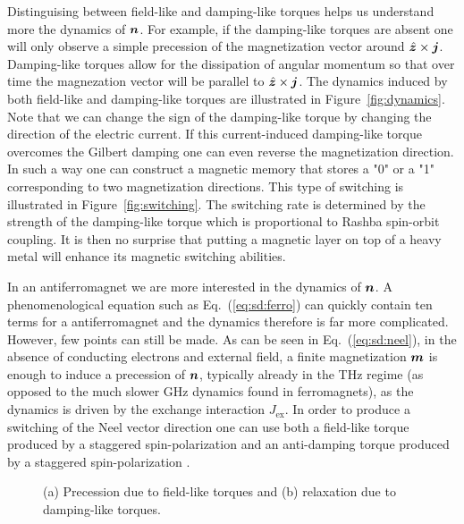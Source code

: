 Distinguising between field-like and damping-like torques helps us understand more the dynamics of $\boldsymbol{n}$. For example, if the damping-like torques are absent one will only observe a simple precession of the magnetization vector around $\hat{\boldsymbol{z}}\times\boldsymbol{j}$. Damping-like torques allow for the dissipation of angular momentum so that over time the magnezation vector will be parallel to $\hat{\boldsymbol{z}}\times\boldsymbol{j}$. The dynamics induced by both field-like and damping-like torques are illustrated in Figure~\ref{fig:dynamics}. Note that we can change the sign of the damping-like torque by changing the direction of the electric current. If this current-induced damping-like torque overcomes the Gilbert damping one can even reverse the magnetization direction. In such a way one can construct a magnetic memory that stores a "0" or a "1" corresponding to two magnetization directions. This type of switching is illustrated in Figure~\ref{fig:switching}. The switching rate is determined by the strength of the damping-like torque which is proportional to Rashba spin-orbit coupling. It is then no surprise that putting a magnetic layer on top of a heavy metal will enhance its magnetic switching abilities. 

In an antiferromagnet we are more interested in the dynamics of $\boldsymbol{n}$. A phenomenological equation such as Eq.~(\ref{eq:sd:ferro}) can quickly contain ten terms for a antiferromagnet and the dynamics therefore is far more complicated. However, few points can still be made. As can be seen in Eq.~(\ref{eq:sd:neel}), in the absence of conducting electrons and external field, a finite magnetization $\boldsymbol{m}$ is enough to induce a precession of $\boldsymbol{n}$, typically already in the THz regime (as opposed to the much slower GHz dynamics found in ferromagnets), as the dynamics is driven by the exchange interaction $J_\text{ex}$. In order to produce a switching of the Neel vector direction one can use both a field-like torque produced by a staggered spin-polarization and an anti-damping torque produced by a staggered spin-polarization \cite{fjaerbu_electrically_2017, cheng_terahertz_2016, khymyn_antiferromagnetic_2017}.

\begin{figure}
\caption{(a) Precession due to field-like torques and (b) relaxation due to damping-like torques. }
\end{figure}

